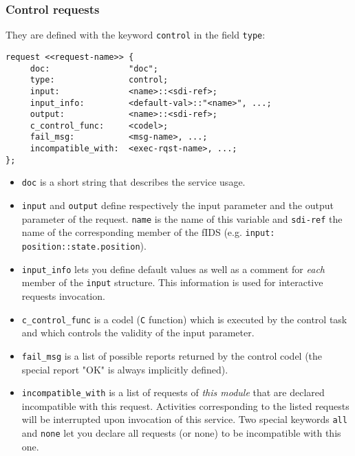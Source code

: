 \subsubsection{Control requests}

They are defined with the keyword {\tt control} in the field {\tt type}:

\begin{center}\begin{cartouche}\small\begin{verbatim}
request <<request-name>> {
     doc:                "doc";
     type:               control;
     input:              <name>::<sdi-ref>; 
     input_info:         <default-val>::"<name>", ...;
     output:             <name>::<sdi-ref>; 
     c_control_func:     <codel>; 
     fail_msg:           <msg-name>, ...;
     incompatible_with:  <exec-rqst-name>, ...;
};
\end{verbatim}\end{cartouche}\end{center}

\begin{itemize}
\item {\tt doc} is a short string that describes the service usage.

\item {\tt input} and {\tt output} define respectively the input
parameter and the output parameter of the request. {\tt name} is the name
of this variable and  {\tt sdi-ref} the name  of the corresponding member
of the fIDS (e.g. {\tt input: position::state.position}).

\item {\tt input\_info} lets you define default values as well as a
comment for {\em  each}   member  of  the  {\tt  input}  structure.  This
information is used for interactive  requests invocation.

\item {\tt c\_control\_func} is a codel ({\tt C} function) which is
executed by the control task and which controls the validity of the input
parameter.

\item {\tt fail\_msg} is a list of possible reports returned by the
control codel (the special report "OK" is always implicitly defined).

\item {\tt incompatible\_with} is a list of requests of {\em this module}
that   are    declared   incompatible  with     this request.  Activities
corresponding to the listed requests will  be interrupted upon invocation
of this service.  Two special keywords {\tt  all} and {\tt none} let  you
declare all requests (or none) to be incompatible with this one.
\end{itemize}


